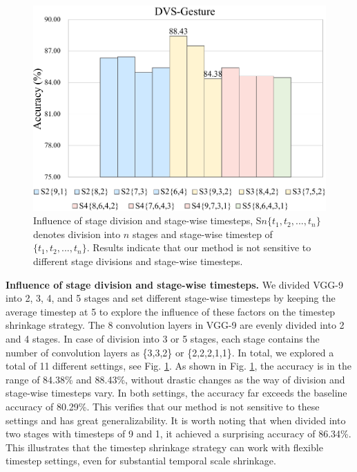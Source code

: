 \documentclass[letterpaper]{article} %
\begin{document}
\begin{figure}[!tb]
\centering
\includegraphics[width=0.8\columnwidth]{stage}
\caption{Influence of stage division and stage-wise timesteps, S$n\{t_1,t_2,... ,t_n\}$ denotes division into $n$ stages and stage-wise timestep of $\{t_1,t_2,... ,t_n\}$. Results indicate that our method is not sensitive to different stage divisions and stage-wise timesteps.}
\label{stage}
\end{figure}
\textbf{Influence of stage division and stage-wise timesteps.} We divided VGG-9 into 2, 3, 4, and 5 stages and set different stage-wise timesteps by keeping the average timestep at 5 to explore the influence of these factors on the timestep shrinkage strategy. The 8 convolution layers in VGG-9 are evenly divided into 2 and 4 stages. In case of division into 3 or 5 stages, each stage contains the number of convolution layers as \{3,3,2\} or \{2,2,2,1,1\}. In total, we explored a total of 11 different settings, see Fig. \ref{stage}. As shown in Fig. \ref{stage}, the accuracy is in the range of 84.38\% and 88.43\%, without drastic changes as the way of division and stage-wise timesteps vary. In both settings, the accuracy far exceeds the baseline accuracy of 80.29\%. This verifies that our method is not sensitive to these settings and has great generalizability. It is worth noting that when divided into two stages with timesteps of 9 and 1, it achieved a surprising accuracy of 86.34\%. This illustrates that the timestep shrinkage strategy can work with flexible timestep settings, even for substantial temporal scale shrinkage.
\end{document}
